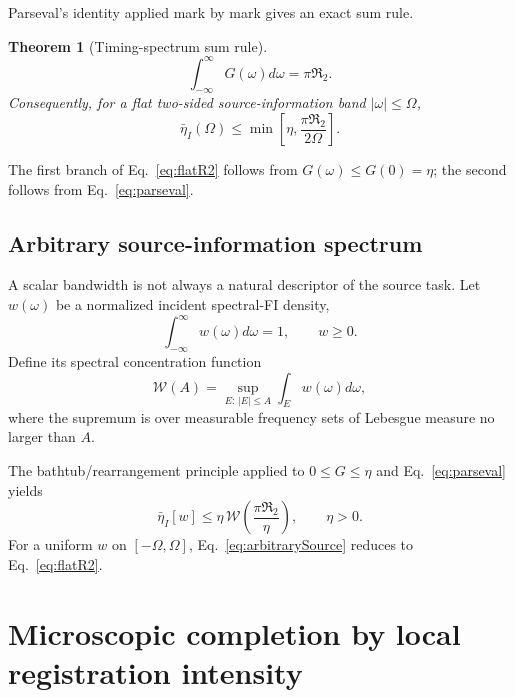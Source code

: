 \documentclass[aps,prapplied,preprint,nofootinbib]{revtex4-2}
\newtheorem{theorem}{Theorem}
\newcommand{\Wcal}{\mathcal W}
\newcommand{\Rtwo}{\mathfrak R_2}
\begin{document}
Parseval's identity applied mark by mark gives an exact sum rule.

\begin{theorem}[Timing-spectrum sum rule]
\begin{equation}
\boxed{
\int_{-\infty}^{\infty}G(\omega)d\omega
=\pi\Rtwo.}
\label{eq:parseval}
\end{equation}
Consequently, for a flat two-sided source-information band $|\omega|\le\Omega$,
\begin{equation}
\boxed{
\bar\eta_I(\Omega)
\le
\min\left[\eta,\frac{\pi\Rtwo}{2\Omega}\right].}
\label{eq:flatR2}
\end{equation}
\end{theorem}

The first branch of Eq.~\eqref{eq:flatR2} follows from $G(\omega)\le G(0)=\eta$; the second follows from Eq.~\eqref{eq:parseval}.

\subsection{Arbitrary source-information spectrum}

A scalar bandwidth is not always a natural descriptor of the source task.  Let $w(\omega)$ be a normalized incident spectral-FI density,
\begin{equation}
\int_{-\infty}^{\infty}w(\omega)d\omega=1,
\qquad w\ge0.
\end{equation}
Define its spectral concentration function
\begin{equation}
\boxed{
\Wcal(A)=\sup_{E:\,|E|\le A}\int_Ew(\omega)d\omega,}
\label{eq:W}
\end{equation}
where the supremum is over measurable frequency sets of Lebesgue measure no larger than $A$.

The bathtub/rearrangement principle applied to $0\le G\le\eta$ and Eq.~\eqref{eq:parseval} yields
\begin{equation}
\boxed{
\bar\eta_I[w]
\le
\eta\,
\Wcal\!\left(\frac{\pi\Rtwo}{\eta}\right),}
\qquad \eta>0.
\label{eq:arbitrarySource}
\end{equation}
For a uniform $w$ on $[-\Omega,\Omega]$, Eq.~\eqref{eq:arbitrarySource} reduces to Eq.~\eqref{eq:flatR2}.

\section{Microscopic completion by local registration intensity}
\label{sec:hazard}
\end{document}
